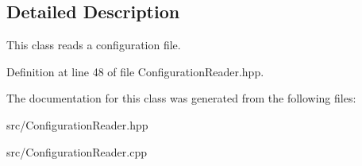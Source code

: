 \subsection{Detailed Description}
This class reads a configuration file. 

Definition at line 48 of file Configuration\+Reader.\+hpp.



The documentation for this class was generated from the following files\+:\begin{DoxyCompactItemize}
\item 
src/Configuration\+Reader.\+hpp\item 
src/Configuration\+Reader.\+cpp\end{DoxyCompactItemize}
